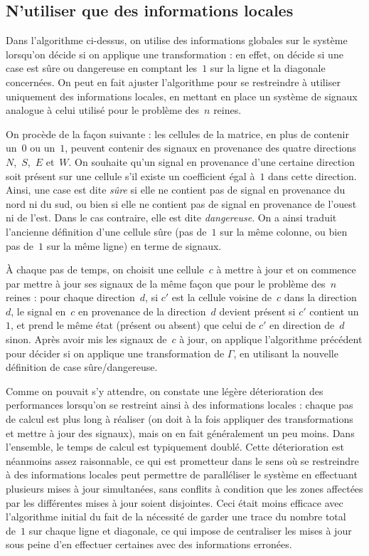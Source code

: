 \subsection{N'utiliser que des informations locales}

Dans l'algorithme ci-dessus, on utilise des informations globales sur le système lorsqu'on décide si on applique une transformation : en effet, on décide si une case est sûre ou dangereuse en comptant les~$1$ sur la ligne et la diagonale concernées. On peut en fait ajuster l'algorithme pour se restreindre à utiliser uniquement des informations locales, en mettant en place un système de signaux analogue à celui utilisé pour le problème des~$n$ reines. 

On procède de la façon suivante : les cellules de la matrice, en plus de contenir un~$0$ ou un~$1$, peuvent contenir des signaux en provenance des quatre directions~$N$,~$S$,~$E$ et~$W$. On souhaite qu'un signal en provenance d'une certaine direction soit présent sur une cellule s'il existe un coefficient égal à~$1$ dans cette direction. Ainsi, une case est dite \emph{sûre} si elle ne contient pas de signal en provenance du nord ni du sud, ou bien si elle ne contient pas de signal en provenance de l'ouest ni de l'est. Dans le cas contraire, elle est dite \emph{dangereuse}. On a ainsi traduit l'ancienne définition d'une cellule sûre (pas de~$1$ sur la même colonne, ou bien pas de~$1$ sur la même ligne) en terme de signaux.

À chaque pas de temps, on choisit une cellule~$c$ à mettre à jour et on commence par mettre à jour ses signaux de la même façon que pour le problème des~$n$ reines : pour chaque direction~$d$, si $c'$ est la cellule voisine de~$c$ dans la direction~$d$, le signal en~$c$ en provenance de la direction~$d$ devient présent si $c'$ contient un~$1$, et prend le même état (présent ou absent) que celui de $c'$ en direction de~$d$ sinon.
Après avoir mis les signaux de~$c$ à jour, on applique l'algorithme précédent pour décider si on applique une transformation de $\Gamma$, en utilisant la nouvelle définition de case sûre/dangereuse. 

Comme on pouvait s'y attendre, on constate une légère déterioration des performances lorsqu'on se restreint ainsi à des informations locales : chaque pas de calcul est plus long à réaliser (on doit à la fois appliquer des transformations et mettre à jour des signaux), mais on en fait généralement un peu moins. Dans l'ensemble, le temps de calcul est typiquement doublé. Cette déterioration est néanmoins assez raisonnable, ce qui est prometteur dans le sens où se restreindre à des informations locales peut permettre de paralléliser le système en effectuant plusieurs mises à jour simultanées, sans conflits à condition que les zones affectées par les différentes mises à jour soient disjointes. Ceci était moins efficace avec l'algorithme initial du fait de la nécessité de garder une trace du nombre total de~$1$ sur chaque ligne et diagonale, ce qui impose de centraliser les mises à jour sous peine d'en effectuer certaines avec des informations erronées.

